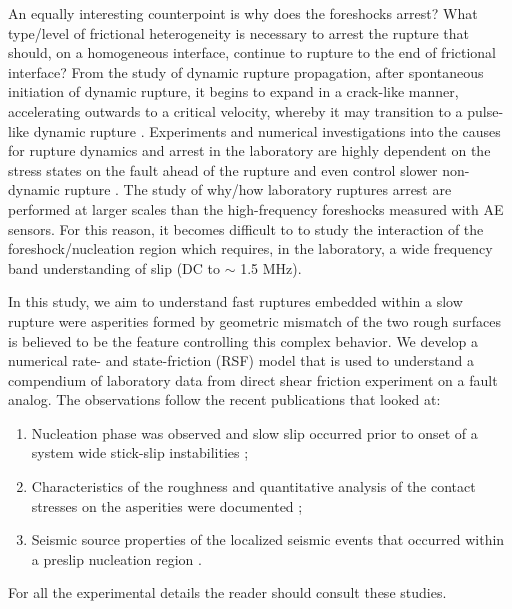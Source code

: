 \documentclass[preprint,1p, 10pt,authoryear]{elsarticle}
\begin{document}
An equally interesting counterpoint is why does the foreshocks arrest? What type/level of frictional heterogeneity is necessary to arrest the rupture that should, on a homogeneous interface, continue to rupture to the end of frictional interface? From the study of dynamic rupture propagation, after spontaneous initiation of dynamic rupture, it begins to expand in a crack-like manner, accelerating outwards to a critical velocity, whereby it may transition to a pulse-like dynamic rupture \citep{Heaton1990, Meier2016}. Experiments and numerical investigations into the causes for rupture dynamics and arrest in the laboratory are highly dependent on the stress states on the fault ahead of the rupture \citep{Rubinstein2004, Ben-David2010, Fineberg2015, Maegawa2010, Tromborg2011, Kammer2012, Otsuki2013, Kammer2015, Albertini2020} and even control slower non-dynamic rupture \citep{Selvadurai2017a}. The study of why/how laboratory ruptures arrest are performed at larger scales than the high-frequency foreshocks measured with AE sensors. For this reason, it becomes difficult to to study the interaction of the foreshock/nucleation region which requires, in the laboratory, a wide frequency band understanding of slip (DC to $\sim$ 1.5 MHz). 

In this study, we aim to understand fast ruptures embedded within a slow rupture were asperities formed by geometric mismatch of the two rough surfaces is believed to be the feature controlling this complex behavior. We develop a numerical rate- and state-friction (RSF) model \citep{Ampuero2008, Rubin2005} that is used to understand a compendium of laboratory data from direct shear friction experiment on a fault analog. The observations follow the recent publications that looked at:

\begin{enumerate}
\item Nucleation phase was observed and slow slip occurred prior to onset of a system wide stick-slip instabilities \citep{Selvadurai2015};
\item Characteristics of the roughness and quantitative analysis of the contact stresses on the asperities were documented \citep{Selvadurai2017};
\item Seismic source properties of the localized seismic events that occurred within a preslip nucleation region \citep{Selvadurai2019}.
\end{enumerate}

\noindent For all the experimental details the reader should consult these studies.
\end{document}
